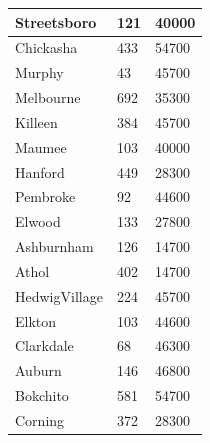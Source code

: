 \documentclass[titlepage]{article}
\begin{document}
\begin{table}[!ht]
\begin{tabular}{|l|l|l|}
        Streetsboro & 121 & 40000 \\ \hline
        Chickasha & 433 & 54700 \\ \hline
        Murphy & 43 & 45700 \\ \hline
        Melbourne & 692 & 35300 \\ \hline
        Killeen & 384 & 45700 \\ \hline
        Maumee & 103 & 40000 \\ \hline
        Hanford & 449 & 28300 \\ \hline
        Pembroke & 92 & 44600 \\ \hline
        Elwood & 133 & 27800 \\ \hline
        Ashburnham & 126 & 14700 \\ \hline
        Athol & 402 & 14700 \\ \hline
        HedwigVillage & 224 & 45700 \\ \hline
        Elkton & 103 & 44600 \\ \hline
        Clarkdale & 68 & 46300 \\ \hline
        Auburn & 146 & 46800 \\ \hline
        Bokchito & 581 & 54700 \\ \hline
        Corning & 372 & 28300 \\ \hline
    \end{tabular}
\end{table}
\end{document}
